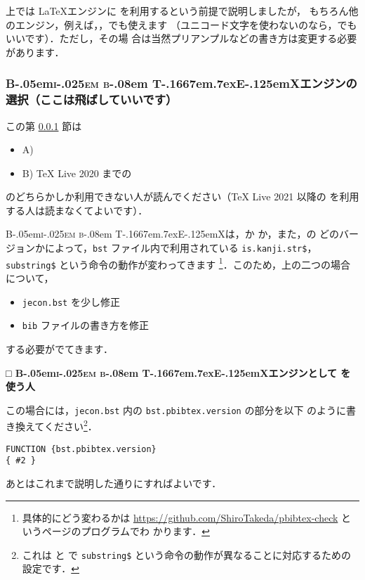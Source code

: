 \documentclass[article]{jlreq}
\newcommand{\BibTeX}{\textrm{B\kern-.05em\textsc{i\kern-.025em b}\kern-.08em%
T\kern-.1667em\lower.7ex\hbox{E}\kern-.125emX}}
\newcommand{\midashiii}[1]{\noindent \textbf{□ #1}}
\begin{document}
上では \LaTeX エンジンに \LuaLaTeX を利用するという前提で説明しましたが，
もちろん他のエンジン，例えば，\upLaTeX，\XeLaTeX でも使えます
（ユニコード文字を使わないのなら，\pLaTeX でもいいです）．ただし，その場
合は当然プリアンプルなどの書き方は変更する必要があります．


\subsubsection{\BibTeX エンジンの選択（ここは飛ばしていいです）}
\label{jecon-example-sec:bibtex-engine}

この第 \ref{jecon-example-sec:bibtex-engine} 節は
\begin{itemize}
 \item A) \pBibTeX
 \item B) TeX Live 2020 までの \upBibTeX
\end{itemize}
のどちらかしか利用できない人が読んでください（TeX Live 2021 以降の
\upBibTeX を利用する人は読まなくてよいです）．

\vspace*{1em}

\BibTeX は，\pBibTeX か \upBibTeX か，また，\upBibTeX の
どのバージョンかによって，\texttt{bst} ファイル内で利用されている
\texttt{is.kanji.str\$}，\texttt{substring\$} という命令の動作が変わってきます
\footnote{具体的にどう変わるかは
\url{https://github.com/ShiroTakeda/pbibtex-check} というページのプログラムでわ
かります．}．このため，上の二つの場合について，
\begin{itemize}
 \item \texttt{jecon.bst} を少し修正
 \item \texttt{bib} ファイルの書き方を修正
\end{itemize}
する必要がでてきます．

\vspace*{1em}

\midashiii{\BibTeX エンジンとして \pBibTeX を使う人}

この場合には，\texttt{jecon.bst} 内の \texttt{bst.pbibtex.version} の部分を以下
のように書き換えてください\footnote{これは \pBibTeX と \upBibTeX
で \texttt{substring\$} という命令の動作が異なることに対応するための設定です．}．
\begin{screen}
\begin{verbatim}
FUNCTION {bst.pbibtex.version}
{ #2 }
\end{verbatim}
\end{screen}

あとはこれまで説明した通りにすればよいです．
\end{document}
